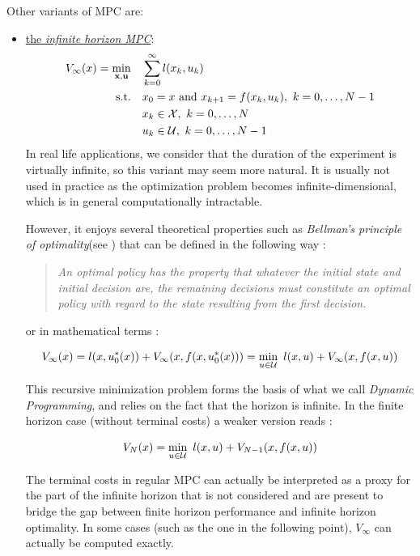 \documentclass[12pt]{article}
\begin{document}
\vspace{12pt}

\noindent Other variants of MPC are:
\begin{itemize}[label=\textbullet]
	\item \underline{the \textit{infinite horizon MPC}}:
	\begin{align*}
		V_\infty(x)=\underset{\bf{x},\bf{u}}{\min} &\quad \sum_{k=0}^{\infty}l(x_k,u_k)\\
		\text{s.t.} &\quad x_0=x\text{ and }x_{k+1}=f(x_k,u_k),~k=0,\dots,N-1\\
		&\quad x_k\in\cal{X},~k=0,\dots,N\\
		&\quad u_k\in\cal{U},~k=0,\dots,N-1
	\end{align*}
	In real life applications, we consider that the duration of the experiment is virtually infinite, so this variant may seem more natural.
	It is usually not used in practice as the optimization problem becomes infinite-dimensional, which is in general computationally intractable.

	However, it enjoys several theoretical properties such as \textit{Bellman's principle of optimality}(see \cite{Bellman:DynamicProgramming}) that can be defined in the following way :
	\begin{quotation}
		\textit{An optimal policy has the property that whatever the initial state and initial decision are, the remaining decisions must constitute an optimal policy with regard to the state resulting from the first decision.}
	\end{quotation}
	or in mathematical terms :

	\begin{equation}
		\label{eq:inf-bellman}
		V_\infty(x)=l(x,u_0^*(x))+V_\infty(x,f(x,u_0^*(x)))=\min_{u\in\cal{U}}~l(x,u)+V_\infty(x,f(x,u))
	\end{equation}

	\noindent This recursive minimization problem forms the basis of what we call \textit{Dynamic Programming}, and relies on the fact that the horizon is infinite.
	In the finite horizon case (without terminal costs) a weaker version reads :

	$$V_N(x)=\min_{u\in\cal{U}}~l(x,u)+V_{N-1}(x,f(x,u))$$

	The terminal costs in regular MPC can actually be interpreted as a proxy for the part of the infinite horizon that is not considered and are present to bridge the gap between finite horizon performance and infinite horizon optimality.
	In some cases (such as the one in the following point), $V_\infty$ can actually be computed exactly.



\end{itemize}
\end{document}
